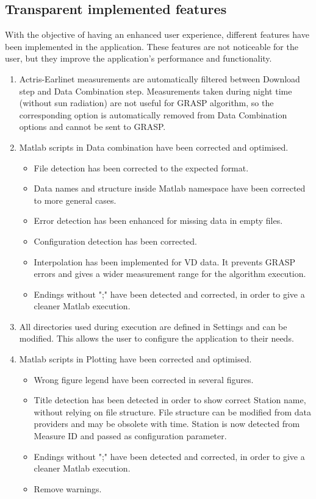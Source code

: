 \subsection{Transparent implemented features}
With the objective of having an enhanced user experience, different features have been implemented in the application. These features are not noticeable for the user, but they improve the application's performance and functionality. 
\begin{enumerate}
    \item Actris-Earlinet measurements are automatically filtered between Download step and Data Combination step. Measurements taken during night time (without sun radiation) are not useful for GRASP algorithm, so the corresponding option is automatically removed from Data Combination options and cannot be sent to GRASP. 
    \item Matlab scripts in Data combination have been corrected and optimised. 
    \begin{itemize}
        \item File detection has been corrected to the expected format.
        \item Data names and structure inside Matlab namespace have been corrected to more general cases.
        \item Error detection has been enhanced for missing data in empty files.
        \item Configuration detection has been corrected.
        \item Interpolation has been implemented for VD data. It prevents GRASP errors and gives a wider measurement range for the algorithm execution.
        \item Endings without ";" have been detected and corrected, in order to give a cleaner Matlab execution.
    \end{itemize}
    \item All directories used during execution are defined in Settings and can be modified. This allows the user to configure the application to their needs.
    \item Matlab scripts in Plotting have been corrected and optimised.
    \begin{itemize}
        \item Wrong figure legend have been corrected in several figures.
        \item Title detection has been detected in order to show correct Station name, without relying on file structure. File structure can be modified from data providers and may be obsolete with time. Station is now detected from Measure ID and passed as configuration parameter.
        \item Endings without ";" have been detected and corrected, in order to give a cleaner Matlab execution.
        \item Remove warnings.
    \end{itemize}
\end{enumerate}

